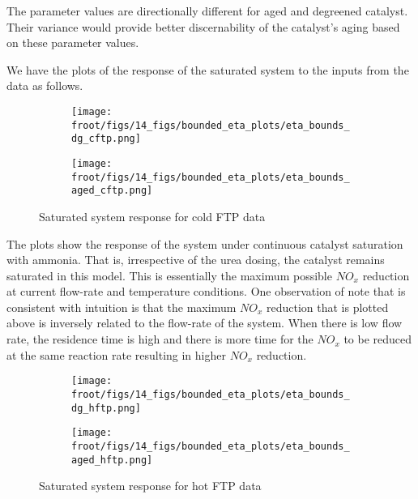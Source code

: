 The parameter values are directionally different for aged and degreened catalyst. Their variance would provide better discernability of the catalyst's aging based on these parameter values.

We have the plots of the response of the saturated system to the inputs from the data as follows.

\begin{figure}[H]
        \begin{minipage}{0.49\textwidth}
                \begin{figure}[H]
                        \centering
                        \texttt{[image: \\froot/figs/14\_figs/bounded\_eta\_plots/eta\_bounds\_dg\_cftp.png]}
                \end{figure}
        \end{minipage}
        \begin{minipage}{0.49\textwidth}
                \begin{figure}[H]
                        \centering
                        \texttt{[image: \\froot/figs/14\_figs/bounded\_eta\_plots/eta\_bounds\_aged\_cftp.png]}
                \end{figure}
        \end{minipage}
        \caption{Saturated system response for cold FTP data}
\end{figure}

The plots show the response of the system under continuous catalyst saturation with ammonia. That is, irrespective of
the urea dosing, the catalyst remains saturated in this model. This is essentially the maximum
possible $NO_x$ reduction at current flow-rate and temperature conditions. One observation of note that is consistent
with intuition is that the maximum $NO_x$ reduction that is plotted above is inversely related to the flow-rate of the
system. When there is low flow rate, the residence time is high and there is more time for the $NO_x$ to be reduced at
the same reaction rate resulting in higher $NO_x$ reduction.

\begin{figure}[H]
        \begin{minipage}{0.49\textwidth}
                \begin{figure}[H]
                        \centering
                        \texttt{[image: \\froot/figs/14\_figs/bounded\_eta\_plots/eta\_bounds\_dg\_hftp.png]}
                \end{figure}
        \end{minipage}
        \begin{minipage}{0.49\textwidth}
                \begin{figure}[H]
                        \centering
                        \texttt{[image: \\froot/figs/14\_figs/bounded\_eta\_plots/eta\_bounds\_aged\_hftp.png]}
                \end{figure}
        \end{minipage}
        \caption{Saturated system response for hot FTP data}
\end{figure}

